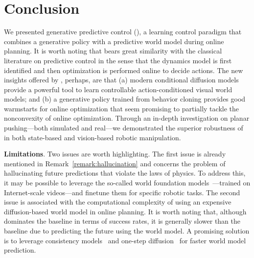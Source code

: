 
\section{Conclusion}
\label{sec:conclusion}

We presented generative predictive control (\nameshort), a learning control paradigm that combines a generative policy with a predictive world model during online planning. It is worth noting that \nameshort bears great similarity with the classical literature on predictive control in the sense that the dynamics model is first identified and then optimization is performed online to decide actions. The new insights offered by \nameshort, perhaps, are that (a) modern conditional diffusion models provide a powerful tool to learn controllable action-conditioned visual world models; and (b) a generative policy trained from behavior cloning provides good warmstarts for online optimization that seem promising to partially tackle the nonconvexity of online optimization. Through an in-depth investigation on planar pushing---both simulated and real---we demonstrated the superior robustness of \nameshort in both state-based and vision-based robotic manipulation.

\textbf{Limitations}. Two issues are worth highlighting. The first issue is already mentioned in Remark~\ref{remark:hallucination} and concerns the problem of hallucinating future predictions that violate the laws of physics. To address this, it may be possible to leverage the so-called world foundation models~\cite{agarwal2025cosmos}---trained on Internet-scale videos---and finetune them for specific robotic tasks. The second issue is associated with the computational complexity of using an expensive diffusion-based world model in online planning. It is worth noting that, although \nameshort dominates the baseline in terms of success rates, it is generally slower than the baseline due to predicting the future using the world model. A promising solution is to leverage consistency models~\cite{song2023consistency} and one-step diffusion~\cite{yin2024one} for faster world model prediction.
